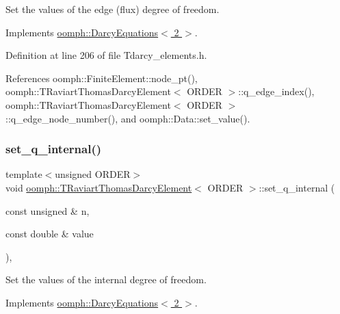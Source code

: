Set the values of the edge (flux) degree of freedom. 



Implements \hyperlink{classoomph_1_1DarcyEquations_a6e1c3c5e23d71d80b7976e61be0ae8e9}{oomph\+::\+Darcy\+Equations$<$ 2 $>$}.



Definition at line 206 of file Tdarcy\+\_\+elements.\+h.



References oomph\+::\+Finite\+Element\+::node\+\_\+pt(), oomph\+::\+T\+Raviart\+Thomas\+Darcy\+Element$<$ O\+R\+D\+E\+R $>$\+::q\+\_\+edge\+\_\+index(), oomph\+::\+T\+Raviart\+Thomas\+Darcy\+Element$<$ O\+R\+D\+E\+R $>$\+::q\+\_\+edge\+\_\+node\+\_\+number(), and oomph\+::\+Data\+::set\+\_\+value().

\mbox{\label{classoomph_1_1TRaviartThomasDarcyElement_a651973d516923c2c032f44dac1503b60}} 
\subsubsection{\texorpdfstring{set\+\_\+q\+\_\+internal()}{set\_q\_internal()}}
{\footnotesize\ttfamily template$<$unsigned O\+R\+D\+ER$>$ \\
void \hyperlink{classoomph_1_1TRaviartThomasDarcyElement}{oomph\+::\+T\+Raviart\+Thomas\+Darcy\+Element}$<$ O\+R\+D\+ER $>$\+::set\+\_\+q\+\_\+internal (\begin{DoxyParamCaption}\item[{const unsigned \&}]{n,  }\item[{const double \&}]{value }\end{DoxyParamCaption})\hspace{0.3cm}{\ttfamily [inline]}, {\ttfamily [virtual]}}



Set the values of the internal degree of freedom. 



Implements \hyperlink{classoomph_1_1DarcyEquations_aafb7955f9dd5b433383ccff10f0fb7a0}{oomph\+::\+Darcy\+Equations$<$ 2 $>$}.




